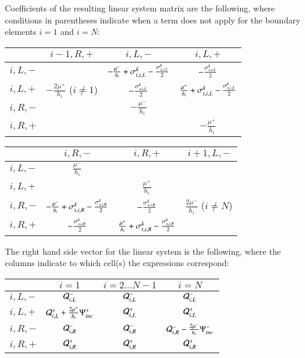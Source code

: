 Coefficients of the resulting linear system matrix are the following,
where conditions in parentheses indicate when a term does not
apply for the boundary elements $i=1$ and $i=N$:
\begin{center}
\begin{tabular}{|l||c|c|c|}\hline
          & $i-1,R,+$ & $i,L,-$ & $i,L,+$\\\hline\hline
  $i,L,-$ &
          & $-\frac{\mu^-}{h_i} + \sigma_{t,i,L}^k - \frac{\sigma_{s,i,L}^k}{2}$
          & $-\frac{\sigma_{s,i,L}^k}{2}$ \\\hline
  $i,L,+$ & $-\frac{2\mu^+}{h_i}$ ($i\ne 1$)
          & $-\frac{\sigma_{s,i,L}^k}{2}$
          & $\frac{\mu^+}{h_i} + \sigma_{t,i,L}^k - \frac{\sigma_{s,i,L}^k}{2}$ \\\hline
  $i,R,-$ &
          & $-\frac{\mu^-}{h_i}$
          & \\\hline
  $i,R,+$ &
          &
          & $-\frac{\mu^+}{h_i}$ \\\hline
\end{tabular}
\end{center}
\begin{center}
\begin{tabular}{|l||c|c|c|}\hline
          & $i,R,-$ & $i,R,+$ & $i+1,L,-$\\\hline\hline
  $i,L,-$ & $\frac{\mu^-}{h_i}$
          &
          & \\\hline
  $i,L,+$ &
          & $\frac{\mu^+}{h_i}$
          & \\\hline
  $i,R,-$ & $-\frac{\mu^-}{h_i} + \sigma_{t,i,R}^k - \frac{\sigma_{s,i,R}^k}{2}$
          & $-\frac{\sigma_{s,i,R}^k}{2}$
          & $\frac{2\mu^-}{h_i}$ ($i\ne N$) \\\hline
  $i,R,+$ & $-\frac{\sigma_{s,i,R}^k}{2}$
          & $\frac{\mu^+}{h_i} + \sigma_{t,i,R}^k - \frac{\sigma_{s,i,R}^k}{2}$
          & \\\hline
\end{tabular}
\end{center}
The right hand side vector for the linear system is the following,
where the columns indicate to which cell(s) the expressions
correspond:

\begin{center}
\begin{tabular}{|l||c|c|c|}\hline
          & $i=1$ & $i=2\ldots N-1$ & $i=N$\\\hline\hline
  $i,L,-$ & $\mathcal{Q}^-_{i,L}$
          & $\mathcal{Q}^-_{i,L}$
          & $\mathcal{Q}^-_{i,L}$ \\\hline
  $i,L,+$ & $\mathcal{Q}^+_{i,L} + \frac{2\mu^+}{h_i}\Psi^+_{inc}$
          & $\mathcal{Q}^+_{i,L}$
          & $\mathcal{Q}^+_{i,L}$ \\\hline
  $i,R,-$ & $\mathcal{Q}^-_{i,R}$
          & $\mathcal{Q}^-_{i,R}$
          & $\mathcal{Q}^-_{i,R} - \frac{2\mu^-}{h_i}\Psi^-_{inc}$ \\\hline
  $i,R,+$ & $\mathcal{Q}^+_{i,R}$
          & $\mathcal{Q}^+_{i,R}$
          & $\mathcal{Q}^+_{i,R}$ \\\hline
\end{tabular}
\end{center}

